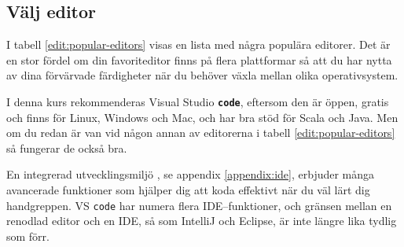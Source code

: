 \subsection{Välj editor}\label{appendix:compile:edit}

I tabell \ref{edit:popular-editors} visas en lista med några populära editorer. Det är en stor fördel om din favoriteditor finns på flera plattformar så att du har nytta av dina förvärvade färdigheter när du behöver växla mellan olika operativsystem.

I denna kurs rekommenderas Visual Studio \textbf{\texttt{code}}, eftersom den är öppen, gratis och finns för Linux, Windows och Mac, och har bra stöd för Scala och Java. Men om du redan är van vid någon annan av editorerna i tabell \ref{edit:popular-editors} så fungerar de också bra. 

En integrerad utvecklingsmiljö , se appendix \ref{appendix:ide}, erbjuder många avancerade funktioner som hjälper dig att koda effektivt när du väl lärt dig handgreppen. VS \texttt{code} har numera flera IDE--funktioner, och gränsen mellan en renodlad editor och en IDE, så som IntelliJ och Eclipse, är inte längre lika tydlig som förr.  %




